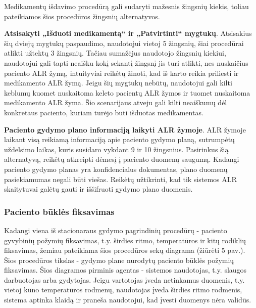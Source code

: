 Medikamentų išdavimo procedūrą gali sudaryti mažesnis žingsnių kiekis, toliau pateikiamos šios procedūros žingsnių alternatyvos.


\textbf{Atsisakyti „Išduoti medikamentą“ ir „Patvirtinti“ mygtukų}. Atsisakius šių dviejų mygtukų paspaudimo, naudotojui vietoj 5 žingsnių, šiai procedūrai atlikti užtektų 3 žingsnių. Tačiau sumažėjus naudotojo žingsnių kiekiui, naudotojui gali tapti neaišku kokį sekantį žingsnį jis turi atlikti, nes nuskaičius paciento ALR žymą, intuityviai reikėtų žinoti, kad iš karto reikia priliesti ir medikamento ALR žymą. Jeigu šių mygtukų nebūtų, naudotojui gali kilti keblumų kuomet nuskaitoma keleto pacientų ALR žymos ir tuomet nuskaitoma medikamento ALR žyma. Šio scenarijaus atveju gali kilti neaiškumų dėl konkretaus paciento, kuriam turėjo būti išduotas medikamentas.

\textbf{Paciento gydymo plano informaciją laikyti ALR žymoje}. ALR žymoje laikant visą reikiamą informaciją apie paciento gydymo planą, sutrumpėtų uždelsimo laikas, kuris susidaro vykdant 9 ir 10 žingsnius. Pasirinkus šią alternatyvą, reikėtų atkreipti dėmesį į paciento duomenų saugumą. Kadangi paciento gydymo planas yra konfidencialus dokumentas, plano duomenų pasiekiamumas negali būti viešas. Reikėtų užtikrinti, kad tik sistemos ALR skaitytuvai galėtų gauti ir iššifruoti gydymo plano duomenis.

\subsubsection{Paciento būklės fiksavimas}
Kadangi viena iš stacionaraus gydymo pagrindinių procedūrų - paciento gyvybinių požymių fiksavimas, t.y. širdies ritmo, temperatūros ir kitų rodiklių fiksavimas, žemiau pateikiama šios procedūros sekų diagrama (žiūrėti 5 pav.). Šios procedūros tikslas - gydymo plane nurodytų paciento būklės požymių fiksavimas. Šios diagramos pirminis agentas - sistemos naudotojas, t.y. slaugos darbuotojas arba gydytojas. Jeigu vartotojas įveda netinkamus duomenis, t.y. vietoj kūno temperatūros rodmenų, naudotojas įveda širdies ritmo rodmenis, sistema aptinka klaidą ir praneša naudotojui, kad įvesti duomenys nėra validūs.

